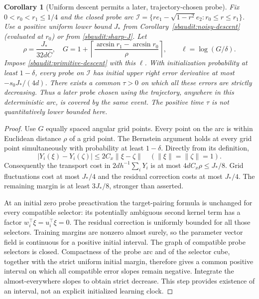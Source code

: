 \documentclass[10pt]{article}
\newtheorem{corollary}[theorem]{Corollary}
\theoremstyle{remark}\newtheorem{remark}[theorem]{Remark}
\begin{document}
\begin{corollary}[Uniform descent permits a later, trajectory-chosen probe]
\label{sbaudit:uniform-descent}
Fix $0<r_0<r_1\le1/4$ and the closed probe arc
$\mathcal I=\{re_1-\sqrt{1-r^2}e_2:r_0\le r\le r_1\}$.
Use a positive uniform lower bound $J_*$ from Corollary~\ref{sbaudit:noisy-descent}
(evaluated at $r_0$) or from \eqref{sbaudit:sharp-J}.
Let
\[
 \rho=\frac{J_*}{32d\overline C},\quad
 G=1+\left\lceil\frac{\arcsin r_1-\arcsin r_0}{\rho}\right\rceil,
 \qquad \ell=\log(G/\delta).
\]
Impose \eqref{sbaudit:primitive-descent} with this $\ell$.
With initialization probability at least $1-\delta$, every probe on
$\mathcal I$ has initial upper right error derivative at most
$-s_0J_*/(4d)$. There exists a common $\tau>0$ on which all these errors
are strictly decreasing. Thus a later probe chosen using the trajectory,
anywhere in this deterministic arc, is covered by the same event.
The positive time $\tau$ is not quantitatively lower bounded here.
\end{corollary}
\begin{proof}
Use $G$ equally spaced angular grid points. Every point on the arc is
within Euclidean distance $\rho$ of a grid point. The Bernstein argument
holds at every grid point simultaneously with probability at least
$1-\delta$. Directly from its definition,
\[
 |Y_i(\xi)-Y_i(\zeta)|\le2C_x\|\xi-\zeta\|
 \quad(\|\xi\|=\|\zeta\|=1).
\]
Consequently the transport cost in $2d h^{-1}\sum_iY_i$ is at most
$4dC_x\rho\le J_*/8$. Grid fluctuations cost at most $J_*/4$ and
the residual correction costs at most $J_*/4$. The remaining margin
is at least $3J_*/8$, stronger than asserted.

At an initial zero probe preactivation the target-pairing formula is
unchanged for every compatible selector: its potentially ambiguous
second kernel term has a factor $w_i^\top\xi=u_i^\top\xi=0$.
The residual correction is uniformly bounded for all those selectors.
Training margins are nonzero almost surely, so the parameter vector
field is continuous for a positive initial interval. The graph of
compatible probe selectors is closed. Compactness of the probe arc
and of the selector cube, together with the strict uniform initial
margin, therefore gives a common positive interval on which all
compatible error slopes remain negative. Integrate the almost-everywhere
slopes to obtain strict decrease. This step provides existence of an
interval, not an explicit initialized learning clock.
\end{proof}
\end{document}
